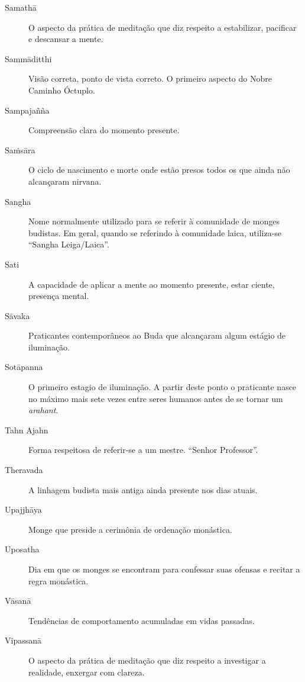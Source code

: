 \begin{description}
  \item[Samathā] O aspecto da prática de meditação que diz respeito a estabilizar, pacificar e descansar a mente.

  \item[Sammāditthi] Visão correta, ponto de vista correto. O primeiro aspecto do Nobre Caminho Óctuplo.

  \item[Sampajañña] Compreensão clara do momento presente.

  \item[Saṁsāra] O ciclo de nascimento e morte onde estão presos todos os que ainda não alcançaram nirvana.

  \item[Sangha] Nome normalmente utilizado para se referir à comunidade de monges budistas. Em geral, quando se referindo à comunidade laica, utiliza-se “Sangha Leiga/Laica”.

  \item[Sati] A capacidade de aplicar a mente ao momento presente, estar ciente, presença mental.

  \item[Sāvaka] Praticantes contemporâneos ao Buda que alcançaram algum estágio de iluminação.

  \item[Sotāpanna] O primeiro estagio de iluminação. A partir deste ponto o praticante nasce no máximo mais sete vezes entre seres humanos antes de se tornar um \emph{arahant}.

  \item[Tahn Ajahn] Forma respeitosa de referir-se a um mestre. “Senhor Professor”.

  \item[Theravada] A linhagem budista mais antiga ainda presente nos dias atuais.

  \item[Upajjhāya] Monge que preside a cerimônia de ordenação monástica.

  \item[Uposatha] Dia em que os monges se encontram para confessar suas ofensas e recitar a regra monástica.

  \item[Vāsanā] Tendências de comportamento acumuladas em vidas passadas.

  \item[Vipassanā] O aspecto da prática de meditação que diz respeito a investigar a realidade, enxergar com clareza.

\end{description}

